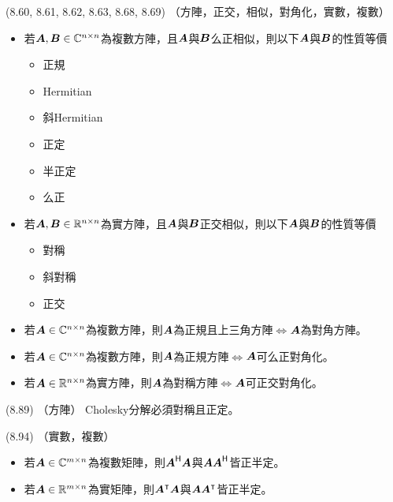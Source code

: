 \item \begin{theorem}{(8.60, 8.61, 8.62, 8.63, 8.68, 8.69)} （方陣，正交，相似，對角化，實數，複數）
	\begin{itemize}
		\item 若$\boldsymbol{A}, \boldsymbol{B} \in \mathbb{C}^{n \times n}$為複數方陣，且$\boldsymbol{A}$與$\boldsymbol{B}$么正相似，則以下$\boldsymbol{A}$與$\boldsymbol{B}$的性質等價
			\begin{itemize}
				\item 正規
				\item Hermitian
				\item 斜Hermitian
				\item 正定
				\item 半正定
				\item 么正
			\end{itemize}
		\item 若$\boldsymbol{A}, \boldsymbol{B} \in \mathbb{R}^{n \times n}$為實方陣，且$\boldsymbol{A}$與$\boldsymbol{B}$正交相似，則以下$\boldsymbol{A}$與$\boldsymbol{B}$的性質等價
		\begin{itemize}
			\item 對稱
			\item 斜對稱
			\item 正交
		\end{itemize}
		\item 若$\boldsymbol{A} \in \mathbb{C}^{n \times n}$為複數方陣，則$\boldsymbol{A}$為正規且上三角方陣$\iff$$\boldsymbol{A}$為對角方陣。
		\item 若$\boldsymbol{A} \in \mathbb{C}^{n \times n}$為複數方陣，則$\boldsymbol{A}$為正規方陣$\iff$$\boldsymbol{A}$可么正對角化。
		\item 若$\boldsymbol{A} \in \mathbb{R}^{n \times n}$為實方陣，則$\boldsymbol{A}$為對稱方陣$\iff$$\boldsymbol{A}$可正交對角化。
	\end{itemize}
\end{theorem}

\item \begin{theorem}{(8.89)} （方陣） Cholesky分解必須對稱且正定。
\end{theorem}

\item \begin{theorem}{(8.94)} （實數，複數）
	\begin{itemize}
		\item 若$\boldsymbol{A} \in \mathbb{C}^{m \times n}$為複數矩陣，則$\boldsymbol{A}^{\mathsf{H}}\boldsymbol{A}$與$\boldsymbol{A}\boldsymbol{A}^{\mathsf{H}}$皆正半定。
		\item 若$\boldsymbol{A} \in \mathbb{R}^{m \times n}$為實矩陣，則$\boldsymbol{A}^\intercal\boldsymbol{A}$與$\boldsymbol{A}\boldsymbol{A}^\intercal$皆正半定。
	\end{itemize}
\end{theorem}

